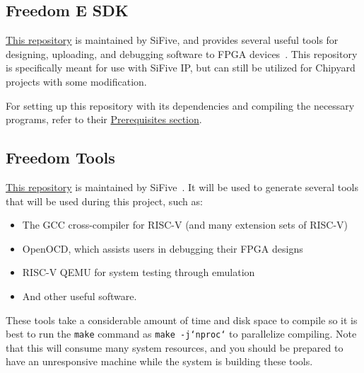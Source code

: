 \subsection{Freedom E SDK}\label{sec:Freedom_E_SDK}
\href{https://github.com/sifive/freedom-e-sdk}{This repository} is maintained by SiFive, and provides several useful tools for designing, uploading, and debugging software to FPGA devices~\cite{freedomESDK}.
This repository is specifically meant for use with SiFive IP, but can still be utilized for Chipyard projects with some modification.

For setting up this repository with its dependencies and compiling the necessary programs, refer to their \href{https://github.com/sifive/freedom-e-sdk#setting-up-the-sdk}{Prerequisites section}.

\subsection{Freedom Tools}\label{sec:Freedom_Tools}
\href{https://github.com/sifive/freedom-tools}{This repository} is maintained by SiFive~\cite{freedomTools}.
It will be used to generate several tools that will be used during this project, such as:
\begin{itemize}
\item The GCC cross-compiler for RISC-V (and many extension sets of RISC-V)
\item OpenOCD, which assists users in debugging their FPGA designs
\item RISC-V QEMU for system testing through emulation
\item And other useful software.
\end{itemize}

These tools take a considerable amount of time and disk space to compile so it is best to run the \texttt{make} command as \texttt{make -j`nproc`} to parallelize compiling.
Note that this will consume many system resources, and you should be prepared to have an unresponsive machine while the system is building these tools.

